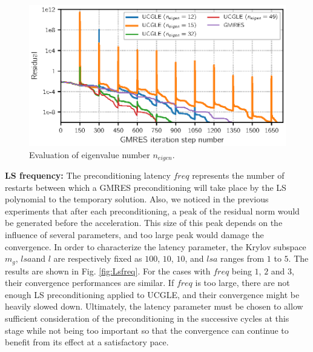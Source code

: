 \begin{figure}[htbp]
	\centering
	\includegraphics[width=6.2in]{fig/conv_eigenvalues.eps}
	\caption{Evaluation of eigenvalue number $n_{eigen}$.}
	\label{fig:vals}
\end{figure}

\textbf{LS frequency: }The preconditioning latency $freq$ represents the number of restarts between which a GMRES preconditioning will take place by the LS polynomial to the temporary solution. Also, we noticed in the previous experiments that after each preconditioning, a peak of the residual norm would be generated before the acceleration. This size of this peak depends on the influence of several parameters, and too large peak would damage the convergence.  In order to characterize the latency parameter, the Krylov subspace $m_g$, $lsa$and $l$ are respectively fixed as $100$, $10$, $10$, and $lsa$ ranges from $1$ to $5$. The results are shown in Fig. \ref{fig:Lsfreq}. For the cases with $freq$ being $1$, $2$ and $3$, their convergence performances are similar. If $freq$ is too large,  there are not enough LS preconditioning applied to UCGLE, and their convergence might be heavily slowed down. Ultimately, the latency parameter must be chosen to allow sufficient consideration of the preconditioning in the successive cycles at this stage while not being too important so that the convergence can continue to benefit from its effect at a satisfactory pace.

